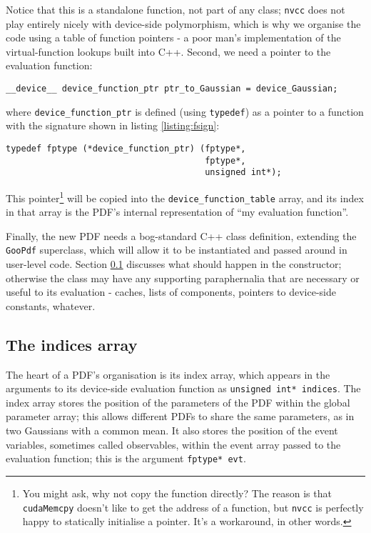 \documentclass[12pt,pdflatex]{article}
\begin{document}
Notice that this is a standalone function, not part of any class; \texttt{nvcc}
does not play entirely nicely with device-side polymorphism, which is why we organise the
code using a table of function pointers - a poor man's implementation of the
virtual-function lookups built into C++. Second, we need a pointer to the 
evaluation function:
\begin{verbatim}
__device__ device_function_ptr ptr_to_Gaussian = device_Gaussian; 
\end{verbatim}
where \texttt{device\_function\_ptr} is defined (using \texttt{typedef}) as a pointer
to a function with the signature shown in listing \ref{listing:fsign}:
\begin{verbatim}
typedef fptype (*device_function_ptr) (fptype*, 
                                       fptype*, 
                                       unsigned int*);
\end{verbatim}
This pointer\footnote{You might ask, why not copy the
function directly? The reason is that \texttt{cudaMemcpy} doesn't
like to get the address of a function, but \texttt{nvcc} is perfectly
happy to statically initialise a pointer. It's a workaround, in other
words.} 
will be copied into the \texttt{device\_function\_table} array,
and its index in that array is the PDF's internal representation of ``my evaluation
function''. 

Finally, the new PDF needs a bog-standard C++ class definition, extending
the \texttt{GooPdf} superclass, which will allow it to be instantiated
and passed around in user-level code. Section \ref{subsec:indexarray} discusses
what should happen in the constructor; otherwise the class may have any supporting
paraphernalia that are necessary or useful to its evaluation - caches, 
lists of components, pointers to device-side constants, whatever. 

\subsection{The indices array}
\label{subsec:indexarray}

The heart of a PDF's organisation is its index array, which 
appears in the arguments to its device-side evaluation function
as \verb|unsigned int* indices|. The index array stores the position
of the parameters of the PDF within the global parameter array;
this allows different PDFs to share the same parameters, as in two
Gaussians with a common mean. It also stores the position of the
event variables, sometimes called observables, within the event array
passed to the evaluation function; this is the argument \verb|fptype* evt|.
\end{document}
